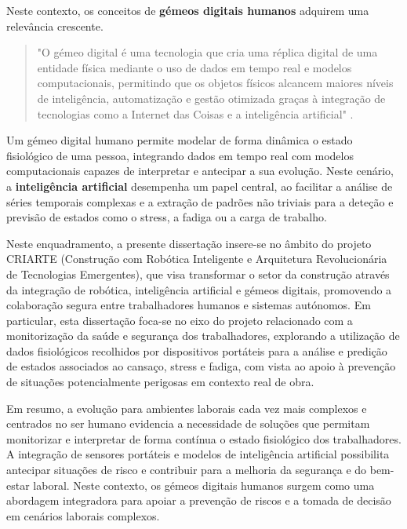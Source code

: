 Neste contexto, os conceitos de \textbf{gémeos digitais humanos} adquirem uma relevância crescente.

\begin{quote}
"O gémeo digital é uma tecnologia que cria uma réplica digital de uma entidade física mediante o uso de dados em tempo real e modelos computacionais, permitindo que os objetos físicos alcancem maiores níveis de inteligência, automatização e gestão otimizada graças à integração de tecnologias como a Internet das Coisas e a inteligência artificial" \citeauthor{lin2024} \citeyear{lin2024} \cite{lin2024}.
\end{quote}

Um gémeo digital humano permite modelar de forma dinâmica o estado fisiológico de uma pessoa, integrando dados em tempo real com modelos computacionais capazes de interpretar e antecipar a sua evolução. Neste cenário, a \textbf{inteligência artificial} desempenha um papel central, ao facilitar a análise de séries temporais complexas e a extração de padrões não triviais para a deteção e previsão de estados como o stress, a fadiga ou a carga de trabalho.

Neste enquadramento, a presente dissertação insere-se no âmbito do projeto CRIARTE (Construção com Robótica Inteligente e Arquitetura Revolucionária de Tecnologias Emergentes), que visa transformar o setor da construção através da integração de robótica, inteligência artificial e gémeos digitais, promovendo a colaboração segura entre trabalhadores humanos e sistemas autónomos. Em particular, esta dissertação foca-se no eixo do projeto relacionado com a monitorização da saúde e segurança dos trabalhadores, explorando a utilização de dados fisiológicos recolhidos por dispositivos portáteis para a análise e predição de estados associados ao cansaço, stress e fadiga, com vista ao apoio à prevenção de situações potencialmente perigosas em contexto real de obra.

Em resumo, a evolução para ambientes laborais cada vez mais complexos e centrados no ser humano evidencia a necessidade de soluções que permitam monitorizar e interpretar de forma contínua o estado fisiológico dos trabalhadores. A integração de sensores portáteis e modelos de inteligência artificial possibilita antecipar situações de risco e contribuir para a melhoria da segurança e do bem-estar laboral. Neste contexto, os gémeos digitais humanos surgem como uma abordagem integradora para apoiar a prevenção de riscos e a tomada de decisão em cenários laborais complexos.

